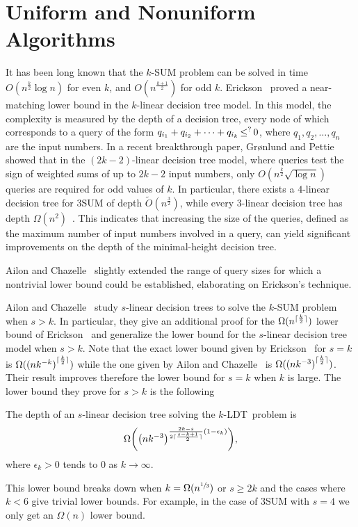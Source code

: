 \section{Uniform and Nonuniform Algorithms}

It has been long known that the \(k\)-SUM problem can be solved in time
$O(n^{\frac{k}{2}}\log n)$ for even $k$, and $O(n^{\frac{k+1}{2}})$ for odd
$k$. Erickson~\cite{Er99a} proved a near-matching lower bound in the $k$-linear
decision tree model. In this model, the complexity is measured by the depth of
a decision tree, every node of which corresponds to a query of the form
$q_{i_1} + q_{i_2} + \cdots + q_{i_k} \mathop{\le}^{?} 0$, where $q_1, q_2, \ldots, q_n$ are the
input numbers. In a recent breakthrough paper, Gr\o nlund and
Pettie~\cite{GP18} showed that in the $(2k-2)$-linear decision tree model,
where queries test the sign of weighted sums of up to $2k-2$ input numbers, only
$O(n^\frac{k}{2}\sqrt{\log n})$ queries are required for odd values of $k$. In
particular, there exists a $4$-linear decision tree for 3SUM of depth
$\tilde{O}(n^\frac{3}{2})$, while every 3-linear decision tree has depth $\Omega
(n^2)$~\cite{Er99a}. This indicates that increasing the size of the queries,
defined as the maximum number of input numbers involved in a query, can yield
significant improvements on the depth of the minimal-height decision tree.

Ailon and
Chazelle~\cite{AC05} slightly extended the range of query sizes for which a
nontrivial lower bound could be established, elaborating on Erickson's
technique.

Ailon and Chazelle~\cite{AC05} study \(s\)-linear decision trees to solve the \(k\)-SUM problem when
\(s > k\). In particular, they give an additional proof for the
$\Omega(n^{\lceil\frac{k}{2}\rceil})$ lower bound of Erickson~\cite{Er99a} and
generalize the lower bound for the \(s\)-linear decision tree model when \(s >
k\). Note that the exact lower bound given by Erickson~\cite{Er99a} for \(s = k\) is
$\Omega({(nk^{-k})}^{\lceil\frac{k}{2}\rceil})$ while the one given by
Ailon and Chazelle~\cite{AC05} is $\Omega({(nk^{-3})}^{\lceil\frac{k}{2}\rceil})$. Their result
improves therefore the lower bound for \(s = k\) when \(k\) is large.
The lower bound they prove for \(s > k\) is the following
\begin{theorem}
The depth of an $s$-linear decision tree solving the \(k\)-LDT\ problem is
$$
\Omega\mleft(\group{nk^{-3}}^{\frac{2k-s}{2\lceil\frac{s-k+1}{2}\rceil}
(1-\epsilon_k) }\mright),
$$
where \(\epsilon_k > 0\) tends to \(0\) as \(k \to\infty\).
\end{theorem}
This lower bound breaks down when
\(k = \Omega(n^{\sfrac{1}{3}})\) or \(s \ge 2 k\) and the cases where \(k < 6\)
give trivial lower bounds. For example, in the case
of 3SUM with \(s = 4\) we only get an $\Omega(n)$ lower bound.

